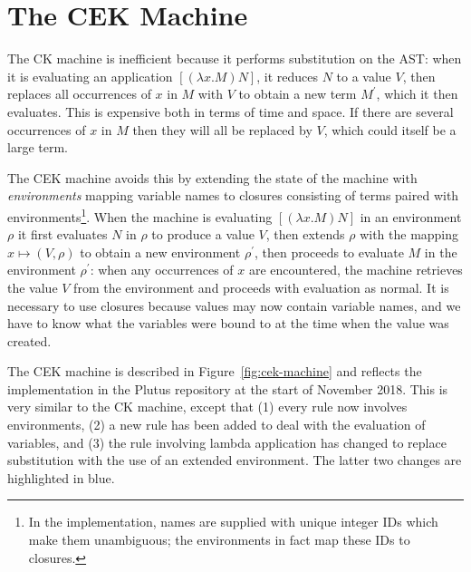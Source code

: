 \documentclass[a4paper]{article}
\begin{document}

\newpage



\newpage


\section{The CEK Machine}
The CK machine is inefficient because it performs substitution on the
AST: when it is evaluating an application $[(\lambda x.M) N]$, it
reduces $N$ to a value $V$, then replaces all occurrences of $x$ in
$M$ with $V$ to obtain a new term $M^\prime$, which it then evaluates.
This is expensive both in terms of time and space.  If there are
several occurrences of $x$ in $M$ then they will all be replaced by
$V$, which could itself be a large term.

The CEK machine avoids this by extending the state of the machine with
\textit{environments} mapping variable names to closures consisting of
terms paired with environments\footnote{In the implementation, names
  are supplied with unique integer IDs which make them unambiguous;
  the environments in fact map these IDs to closures.}.  When the
machine is evaluating $[(\lambda x.M) N]$ in an environment $\rho$ it
first evaluates $N$ in $\rho$ to produce a value $V$, then extends
$\rho$ with the mapping $x \mapsto (V,\rho)$ to obtain a new
environment $\rho^{\prime}$, then proceeds to evaluate $M$ in the
environment $\rho^\prime$: when any occurrences of $x$ are encountered,
the machine retrieves the value $V$ from the environment and proceeds
with evaluation as normal.  It is necessary to use closures because
values may now contain variable names, and we have to know what the
variables were bound to at the time when the value was created.


The CEK machine is described in Figure~\ref{fig:cek-machine} and
reflects the implementation in the Plutus repository at the start of
November 2018.  This is very similar to the CK machine, except that
(1) every rule now involves environments, (2) a new rule has been
added to deal with the evaluation of variables, and (3) the rule
involving lambda application has changed to replace substitution with
the use of an extended environment. The latter two changes are
highlighted in blue.
\end{document}
